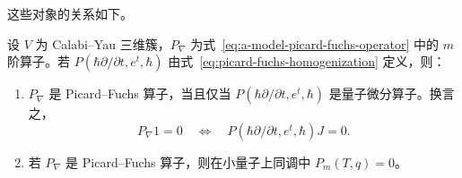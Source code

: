 这些对象的关系如下。
\begin{theorem}\label{thm:picard-fuchs-quantum-equivalence}
设 $V$ 为 Calabi--Yau 三维簇，$P_\nabla$ 为式~\eqref{eq:a-model-picard-fuchs-operator} 中的 $m$ 阶算子。若 $P(\hbar\partial/\partial t,e^t,\hbar)$ 由式~\eqref{eq:picard-fuchs-homogenization} 定义，则：
\begin{enumerate}[label=(\roman*)]
\item $P_\nabla$ 是 Picard--Fuchs 算子，当且仅当 $P(\hbar\partial/\partial t,e^t,\hbar)$ 是量子微分算子。换言之，
\[
P_\nabla1=0\quad\Longleftrightarrow\quad
P(\hbar\partial/\partial t,e^t,\hbar)J=0.
\]
\item 若 $P_\nabla$ 是 Picard--Fuchs 算子，则在小量子上同调中 $P_m(T,q)=0$。
\end{enumerate}
\end{theorem}
